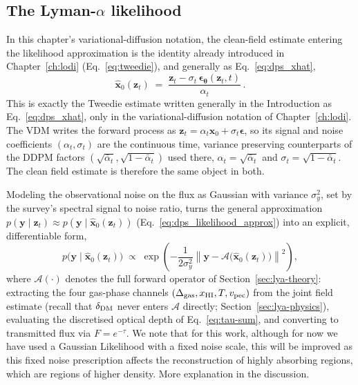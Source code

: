 \subsection{The Lyman-$\alpha$ likelihood}
\label{sec:dps_tweedie}

In this chapter's variational-diffusion notation, the clean-field estimate entering the likelihood approximation is the identity already introduced in Chapter~\ref{ch:lodi} (Eq.~\ref{eq:tweedie}), and generally as Eq.~\ref{eq:dps_xhat},
\begin{equation}
\hat{\bm{x}}_0(\bm{z}_t) \;=\; \frac{\bm{z}_t - \sigma_t\,\hat{\bm\epsilon}_{\bm\theta}(\bm{z}_t,t)}{\alpha_t}\,.
\label{eq:dps_tweedie}
\end{equation}
This is exactly the Tweedie estimate written generally in the Introduction as Eq.~\ref{eq:dps_xhat}, only in the variational-diffusion notation of Chapter~\ref{ch:lodi}. The VDM writes the forward process as $\bm{z}_t = \alpha_t\bm{x}_0 + \sigma_t\bm{\epsilon}$, so its signal and noise coefficients $(\alpha_t,\sigma_t)$ are the continuous time, variance preserving counterparts of the DDPM factors $(\sqrt{\bar\alpha_t},\sqrt{1-\bar\alpha_t})$ used there, $\alpha_t=\sqrt{\bar\alpha_t}$ and $\sigma_t=\sqrt{1-\bar\alpha_t}$. The clean field estimate is therefore the same object in both.

Modeling the observational noise on the flux as Gaussian with variance $\sigma_y^2$, set by the survey's spectral signal to noise ratio, turns the general approximation $p(\bm{y}\mid\bm{z}_t)\approx p(\bm{y}\mid\hat{\bm{x}}_0(\bm{z}_t))$ (Eq.~\ref{eq:dps_likelihood_approx}) into an explicit, differentiable form,
\begin{equation}
p\!\big(\bm{y}\mid\hat{\bm{x}}_0(\bm{z}_t)\big) \;\propto\; \exp\!\left(-\frac{1}{2\sigma_y^2}\left\lVert\bm{y}-\mathcal{A}\!\big(\hat{\bm{x}}_0(\bm{z}_t)\big)\right\rVert^2\right),
\label{eq:dps_gaussian_likelihood}
\end{equation}
where $\mathcal{A}(\cdot)$ denotes the full forward operator of Section~\ref{sec:lya-theory}: extracting the four gas-phase channels $(\Delta_{\rm gas},x_{\rm HI},T,v_{\rm pec})$ from the joint field estimate (recall that $\delta_{\rm DM}$ never enters $\mathcal{A}$ directly; Section~\ref{sec:lya-physics}), evaluating the discretised optical depth of Eq.~\ref{eq:tau-sum}, and converting to transmitted flux via $F=e^{-\tau}$. We note that for this work, although for now we have used a Gaussian Likelihood with a fixed noise scale, this will be improved as this fixed noise prescription affects the reconstruction of highly absorbing regions, which are regions of higher density. More explanation in the discussion.

